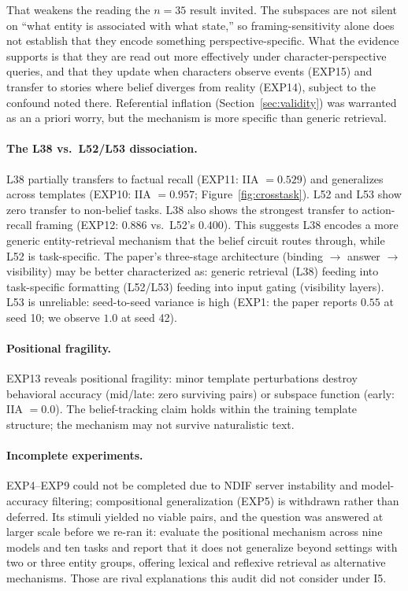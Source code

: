 \documentclass{article}
\begin{document}
That weakens the reading the $n = 35$ result invited. The subspaces are not silent on
``what entity is associated with what state,'' so framing-sensitivity alone does not
establish that they encode something perspective-specific. What the evidence supports is
that they are read out more effectively under character-perspective queries, and that they
update when characters observe events (EXP15) and transfer to stories where belief diverges
from reality (EXP14), subject to the confound noted there. Referential inflation (Section~\ref{sec:validity}) was warranted as an a priori worry, but the mechanism is more specific than generic retrieval.

\paragraph{The L38 vs.\ L52/L53 dissociation.}
L38 partially transfers to factual recall (EXP11: IIA $= 0.529$) and generalizes across templates (EXP10: IIA $= 0.957$; Figure~\ref{fig:crosstask}). L52 and L53 show zero transfer to non-belief tasks. L38 also shows the strongest transfer to action-recall framing (EXP12: $0.886$ vs.\ L52's $0.400$). This suggests L38 encodes a more generic entity-retrieval mechanism that the belief circuit routes through, while L52 is task-specific. The paper's three-stage architecture (binding $\to$ answer $\to$ visibility) may be better characterized as: generic retrieval (L38) feeding into task-specific formatting (L52/L53) feeding into input gating (visibility layers). L53 is unreliable: seed-to-seed variance is high (EXP1: the paper reports $0.55$ at seed 10; we observe $1.0$ at seed 42).

\paragraph{Positional fragility.}
EXP13 reveals positional fragility: minor template perturbations destroy behavioral accuracy (mid/late: zero surviving pairs) or subspace function (early: IIA $= 0.0$). The belief-tracking claim holds within the training template structure; the mechanism may not survive naturalistic text.

\paragraph{Incomplete experiments.}
EXP4--EXP9 could not be completed due to NDIF server instability and model-accuracy filtering; compositional generalization (EXP5) is withdrawn rather than deferred. Its stimuli yielded no viable pairs, and the question was answered at larger scale before we re-ran it: \citet{gurarieh2025mixing} evaluate the positional mechanism across nine models and ten tasks and report that it does not generalize beyond settings with two or three entity groups, offering lexical and reflexive retrieval as alternative mechanisms. Those are rival explanations this audit did not consider under I5.
\end{document}
